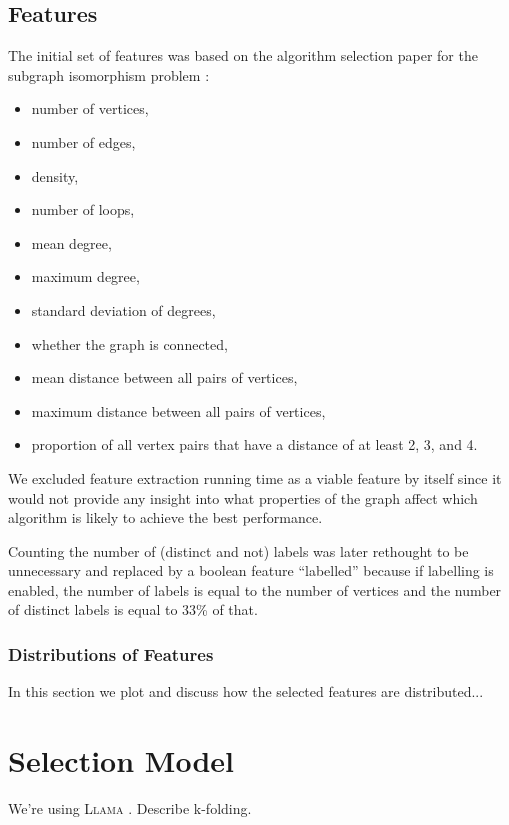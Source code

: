 \documentclass{article}
\theoremstyle{definition}
\begin{document}
\subsection{Features}
The initial set of features was based on the algorithm selection paper for the subgraph isomorphism
problem \cite{DBLP:conf/lion/KotthoffMS16}:

\begin{itemize}
\item number of vertices,
\item number of edges,
\item density,
\item number of loops,
\item mean degree,
\item maximum degree,
\item standard deviation of degrees,
\item whether the graph is connected,
\item mean distance between all pairs of vertices,
\item maximum distance between all pairs of vertices,
\item proportion of all vertex pairs that have a distance of at least 2, 3, and 4.
\end{itemize}

We excluded feature extraction running time as a viable feature by itself since it would
not provide any insight into what properties of the graph affect which algorithm
is likely to achieve the best performance.

Counting the number of (distinct and not) labels was later rethought to be
unnecessary and replaced by a boolean feature ``labelled'' because if labelling
is enabled, the number of labels is equal to the number of vertices and the
number of distinct labels is equal to 33\% of that.

\subsubsection{Distributions of Features}
In this section we plot and discuss how the selected features are distributed...

\section{Selection Model}
We're using \textsc{Llama} \cite{kotthoff_llama_2013}. Describe k-folding.

\printbibliography
\end{document}
